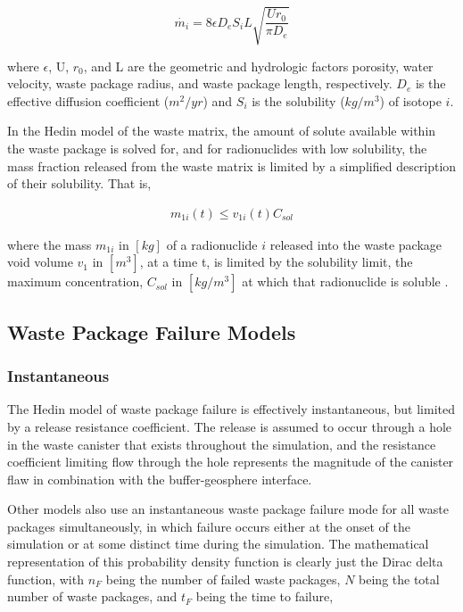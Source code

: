 \begin{equation}
 \dot{m_i}=8\epsilon D_eS_iL\sqrt{\frac{Ur_0}{\pi D_e}}
\end{equation} 

where $\epsilon$, U, $r_0$, and L are the geometric and
hydrologic factors porosity, water velocity, waste package radius, and waste
package length, respectively. $D_e$ is the effective diffusion coefficient
($m^2/yr$)  and $S_i$ is the solubility ($kg/m^3$) of isotope $i$.

In the Hedin model of the waste matrix, the amount of solute available within
the waste package is solved for, and for radionuclides with low solubility, the mass
fraction released from the waste matrix is limited by a simplified description
of their solubility. That is, 

\begin{align} 
  m_{1i}(t)\le v_{1i}(t)C_{sol}
\end{align}

where the mass $m_{1i}$ in $[kg]$ of a radionuclide $i$ released into the waste package
void volume $v_1$ in $[m^3]$, at a time t, is limited by the solubility limit, 
the maximum concentration, $C_{sol}$ in $[kg/m^3]$ at which that radionuclide is 
soluble \cite{hedin_integrated_2002}.


\subsection{Waste Package Failure Models}




\subsubsection{Instantaneous}

The Hedin model of waste package failure is effectively instantaneous, but
limited by a release resistance coefficient. The release is assumed  to occur
through a hole in the waste canister that exists throughout the simulation, and
the resistance coefficient limiting flow through the hole represents the
magnitude of the canister flaw in combination with the buffer-geosphere
interface\cite{hedin_integrated_2002}.

Other models also use an instantaneous waste package failure mode for all waste  
packages simultaneously, in which failure occurs either at the onset of the simulation
or at some distinct time during the simulation. The mathematical representation of this 
probability density function is clearly just the Dirac delta function, with $n_F$ 
being the number of failed waste packages, $N$ being the total number of waste 
packages, and $t_F$ being the time to failure,

